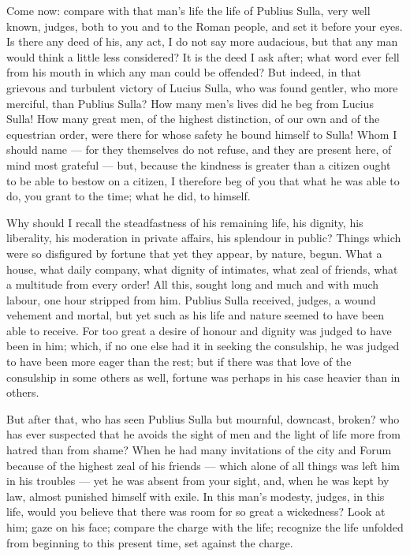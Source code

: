  Come now: compare with that man's life the life of Publius Sulla, very well known, judges, both to you and to the Roman people, and set it before your eyes. Is there any deed of his, any act, I do not say more audacious, but that any man would think a little less considered? It is the deed I ask after; what word ever fell from his mouth in which any man could be offended? But indeed, in that grievous and turbulent victory of Lucius Sulla, who was found gentler, who more merciful, than Publius Sulla? How many men's lives did he beg from Lucius Sulla! How many great men, of the highest distinction, of our own and of the equestrian order, were there for whose safety he bound himself to Sulla! Whom I should name --- for they themselves do not refuse, and they are present here, of mind most grateful --- but, because the kindness is greater than a citizen ought to be able to bestow on a citizen, I therefore beg of you that what he was able to do, you grant to the time; what he did, to himself.

 Why should I recall the steadfastness of his remaining life, his dignity, his liberality, his moderation in private affairs, his splendour in public? Things which were so disfigured by fortune that yet they appear, by nature, begun. What a house, what daily company, what dignity of intimates, what zeal of friends, what a multitude from every order! All this, sought long and much and with much labour, one hour stripped from him. Publius Sulla received, judges, a wound vehement and mortal, but yet such as his life and nature seemed to have been able to receive. For too great a desire of honour and dignity was judged to have been in him; which, if no one else had it in seeking the consulship, he was judged to have been more eager than the rest; but if there was that love of the consulship in some others as well, fortune was perhaps in his case heavier than in others.

 But after that, who has seen Publius Sulla but mournful, downcast, broken? who has ever suspected that he avoids the sight of men and the light of life more from hatred than from shame? When he had many invitations of the city and Forum because of the highest zeal of his friends --- which alone of all things was left him in his troubles --- yet he was absent from your sight, and, when he was kept by law, almost punished himself with exile. In this man's modesty, judges, in this life, would you believe that there was room for so great a wickedness? Look at him; gaze on his face; compare the charge with the life; recognize the life unfolded from beginning to this present time, set against the charge.

